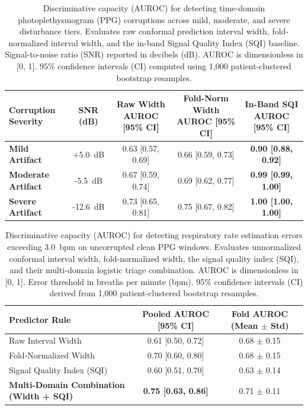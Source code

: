 \begin{table}[htbp]
\centering
\caption{Discriminative capacity (AUROC) for detecting time-domain photoplethysmogram (PPG) corruptions across mild, moderate, and severe disturbance tiers. Evaluates raw conformal prediction interval width, fold-normalized interval width, and the in-band Signal Quality Index (SQI) baseline. Signal-to-noise ratio (SNR) reported in decibels (dB). AUROC is dimensionless in [0, 1]. 95\% confidence intervals (CI) computed using 1,000 patient-clustered bootstrap resamples.}
\label{tab:corruption_auroc}
\begin{tabular}{lcccc}
\toprule
\textbf{Corruption Severity} & \textbf{SNR (dB)} & \textbf{Raw Width AUROC [95\% CI]} & \textbf{Fold-Norm Width AUROC [95\% CI]} & \textbf{In-Band SQI AUROC [95\% CI]} \\
\midrule
\textbf{Mild Artifact} & +5.0~dB & 0.63 [0.57, 0.69] & 0.66 [0.59, 0.73] & \textbf{0.90 [0.88, 0.92]} \\
\textbf{Moderate Artifact} & -5.5~dB & 0.67 [0.59, 0.74] & 0.69 [0.62, 0.77] & \textbf{0.99 [0.99, 1.00]} \\
\textbf{Severe Artifact} & -12.6~dB & 0.73 [0.65, 0.81] & 0.75 [0.67, 0.82] & \textbf{1.00 [1.00, 1.00]} \\
\bottomrule
\end{tabular}
\end{table}


\begin{table}[htbp]
\centering
\caption{Discriminative capacity (AUROC) for detecting respiratory rate estimation errors exceeding 3.0~bpm on uncorrupted clean PPG windows. Evaluates unnormalized conformal interval width, fold-normalized width, the signal quality index (SQI), and their multi-domain logistic triage combination. AUROC is dimensionless in [0, 1]. Error threshold in breaths per minute (bpm). 95\% confidence intervals (CI) derived from 1,000 patient-clustered bootstrap resamples.}
\label{tab:clean_error_detection_auroc}
\begin{tabular}{lcc}
\toprule
\textbf{Predictor Rule} & \textbf{Pooled AUROC [95\% CI]} & \textbf{Fold AUROC (Mean $\pm$ Std)} \\
\midrule
Raw Interval Width & 0.61 [0.50, 0.72] & 0.68 $\pm$ 0.15 \\
Fold-Normalized Width & 0.70 [0.60, 0.80] & 0.68 $\pm$ 0.15 \\
Signal Quality Index (SQI) & 0.60 [0.51, 0.70] & 0.63 $\pm$ 0.14 \\
\textbf{Multi-Domain Combination (Width + SQI)} & \textbf{0.75 [0.63, 0.86]} & 0.71 $\pm$ 0.11 \\
\bottomrule
\end{tabular}
\end{table}


